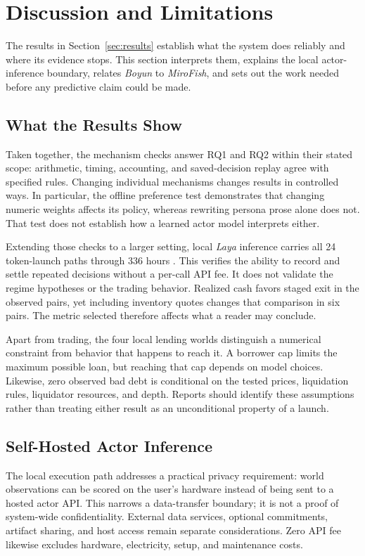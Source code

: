 \section{Discussion and Limitations}\label{sec:discussion}
The results in Section~\ref{sec:results} establish what the system does
reliably and where its evidence stops. This section interprets them, explains
the local actor-inference boundary, relates \textit{Boyun} to
\textit{MiroFish}, and sets out the work needed before any predictive claim
could be made.

\subsection{What the Results Show}
Taken together, the mechanism checks answer RQ1 and RQ2 within their stated
scope: arithmetic, timing, accounting, and saved-decision replay agree with
specified rules. Changing individual mechanisms changes results in controlled
ways. In particular, the offline preference test demonstrates that changing
numeric weights affects its policy, whereas rewriting persona prose alone does
not. That test does not establish how a learned actor model interprets either.

Extending those checks to a larger setting, local \textit{Laya} inference
carries all 24 token-launch paths  through 336 hours . This verifies the ability
to record and settle repeated  decisions without a per-call API fee.
It does not validate the regime hypotheses or the trading behavior. Realized
cash favors staged exit in the observed pairs, yet including inventory quotes
 changes that comparison in six pairs. The metric selected therefore affects
what a reader may conclude.

Apart from trading, the four local lending worlds distinguish a numerical
constraint from behavior that happens to reach it. A borrower cap limits the
maximum possible loan, but reaching that cap depends on model choices. Likewise,
zero observed bad debt is conditional on the tested prices, liquidation rules,
liquidator resources, and depth. Reports should identify these assumptions
rather than treating either result as an unconditional property of a launch.

\subsection{Self-Hosted Actor Inference}
The local execution path addresses a practical privacy requirement:
world observations can be scored on the user's hardware instead of being sent
to a hosted actor API. This narrows a data-transfer boundary; it is not a proof
of system-wide confidentiality. External data services, optional commitments,
artifact sharing, and host access remain separate considerations. Zero API
fee likewise excludes hardware, electricity, setup, and maintenance costs.


